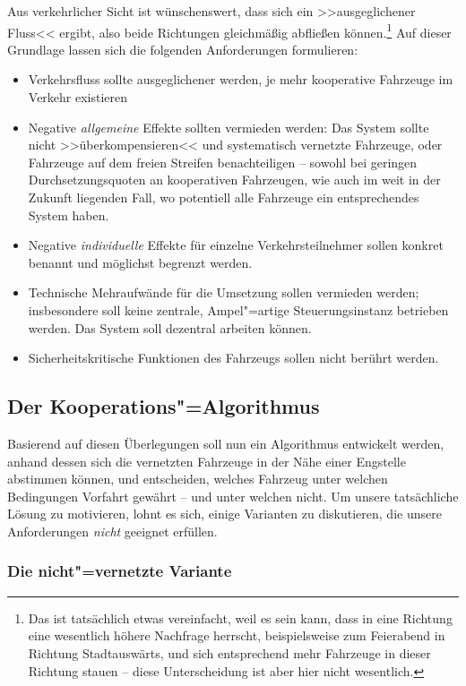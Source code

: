 Aus verkehrlicher Sicht ist wünschenswert, dass sich ein >>ausgeglichener Fluss<< ergibt, also beide Richtungen gleichmäßig abfließen können.\footnote{Das ist tatsächlich etwas vereinfacht, weil es sein kann, dass in eine Richtung eine wesentlich höhere Nachfrage herrscht, beispielsweise zum Feierabend in Richtung Stadtauswärts, und sich entsprechend mehr Fahrzeuge in dieser Richtung stauen -- diese Unterscheidung ist aber hier nicht wesentlich.} Auf dieser Grundlage lassen sich die folgenden Anforderungen formulieren:
\begin{itemize}
	\item Verkehrsfluss sollte ausgeglichener werden, je mehr kooperative Fahrzeuge im Verkehr existieren
	\item Negative \emph{allgemeine} Effekte sollten vermieden werden: Das System sollte nicht >>überkompensieren<< und systematisch vernetzte Fahrzeuge, oder Fahrzeuge auf dem freien Streifen benachteiligen -- sowohl bei geringen Durchsetzungsquoten an kooperativen Fahrzeugen, wie auch im weit in der Zukunft liegenden Fall, wo potentiell alle Fahrzeuge ein entsprechendes System haben.
	\item Negative \emph{individuelle} Effekte für einzelne Verkehrsteilnehmer sollen konkret benannt und möglichst begrenzt werden.
	\item Technische Mehraufwände für die Umsetzung sollen vermieden werden; insbesondere soll keine zentrale, Ampel"=artige Steuerungsinstanz betrieben werden. Das System soll dezentral arbeiten können.
	\item Sicherheitskritische Funktionen des Fahrzeugs sollen nicht berührt werden.
\end{itemize}





\subsection{Der Kooperations"=Algorithmus}\label{sec:algorithm}

Basierend auf diesen Überlegungen soll nun ein Algorithmus entwickelt werden, anhand dessen sich die vernetzten Fahrzeuge in der Nähe einer Engstelle abstimmen können, und entscheiden, welches Fahrzeug unter welchen Bedingungen Vorfahrt gewährt -- und unter welchen nicht. Um unsere tatsächliche Lösung zu motivieren, lohnt es sich, einige Varianten zu diskutieren, die unsere Anforderungen \emph{nicht} geeignet erfüllen.

\subsubsection{Die nicht"=vernetzte Variante}

